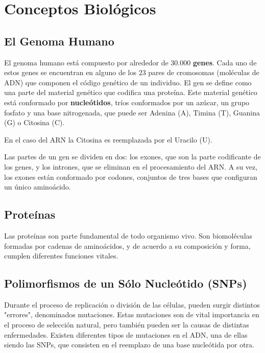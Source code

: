 \section{Conceptos Biológicos}

\subsection{El Genoma Humano}

El genoma humano está compuesto por alrededor de 30.000 \textbf{genes}. Cada uno de estos genes se encuentran en alguno de los 23 pares de cromosomas (moléculas de ADN) que componen el código genético de un individuo. 
El gen se define como una parte del material genético que codifica una proteína. Este material genético está conformado por \textbf{nucleótidos}, tríos conformados por un azúcar, un grupo fosfato y una base nitrogenada, que puede ser Adenina (A), Timina (T), Guanina (G) o Citosina (C). 





En el caso del ARN la Citosina es reemplazada por el Uracilo (U).

Las partes de un gen se dividen en dos: los exones, que son la parte codificante de los genes, y los intrones, que se eliminan en el procesamiento del ARN. 
A su vez, los exones están conformado por codones, conjuntos de tres bases que configuran un único aminoácido. 


\subsection{Proteínas}

Las proteínas son parte fundamental de todo organismo vivo. Son biomoléculas formadas por cadenas de aminoácidos, y de acuerdo a su composición y forma, cumplen diferentes funciones vitales.

\subsection{Polimorfismos de un Sólo Nucleótido (SNPs)}

Durante el proceso de replicación o división de las células, pueden surgir distintos "errores", denominados mutaciones. Estas mutaciones son de vital importancia en el proceso de selección natural, pero también pueden ser la causas de distintas enfermedades. Existen diferentes tipos de mutaciones en el ADN, una de ellas siendo las SNPs, que consisten en el reemplazo de una base nucleótida por otra.


